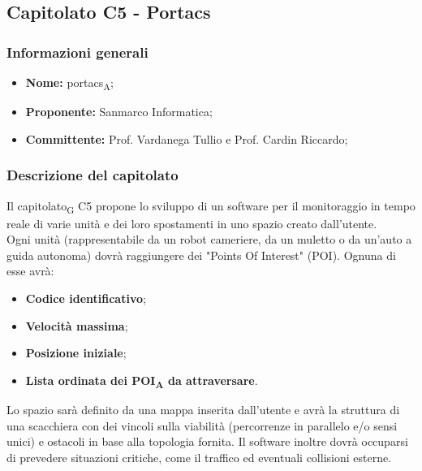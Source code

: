 \subsection{Capitolato C5 - Portacs}
\subsubsection{Informazioni generali}
	\begin{itemize}
	\item \textbf{Nome:} \acrshort{portacs}\textsubscript{A};
	\item \textbf{Proponente:} Sanmarco Informatica;
	\item \textbf{Committente:}  Prof. Vardanega Tullio e Prof. Cardin Riccardo;
	\end{itemize}
\subsubsection{Descrizione del capitolato}
Il \gls{capitolato}\textsubscript{G} C5 propone lo sviluppo di un software per il monitoraggio in tempo reale di varie unità e dei loro spostamenti in uno spazio creato dall'utente. \\
Ogni unità (rappresentabile da un robot cameriere, da un muletto o da un'auto a guida autonoma) dovrà raggiungere dei "Points Of Interest" (POI).
Ognuna di esse avrà: 
\begin{itemize}
	\item \textbf{Codice identificativo};
	\item \textbf{Velocità massima};
	\item \textbf{Posizione iniziale};
	\item \textbf{Lista ordinata dei \acrshort{POI}\textsubscript{A} da attraversare}.
\end{itemize}
Lo spazio sarà definito da una mappa inserita dall'utente e avrà la struttura di una scacchiera con dei vincoli sulla viabilità (percorrenze in parallelo e/o sensi unici) e ostacoli in base alla topologia fornita.
Il software inoltre dovrà occuparsi di prevedere situazioni critiche, come il traffico ed eventuali collisioni esterne.

